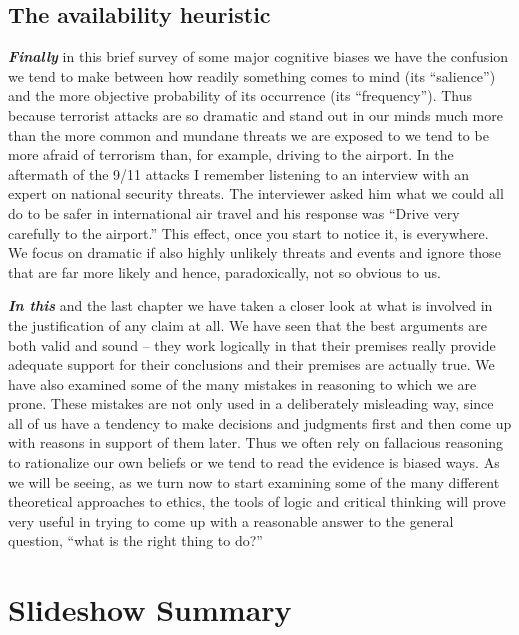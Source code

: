 \documentclass[
  12pt, openany]{book}
\theoremstyle{definition}
\theoremstyle{definition}
\theoremstyle{definition}
\theoremstyle{remark}
\begin{document}
\hypertarget{the-availability-heuristic}{%
\subsection*{The availability heuristic}\label{the-availability-heuristic}}


\textbf{\emph{Finally}} in this brief survey of some major cognitive biases we have the confusion we tend to make between how readily something comes to mind (its ``salience'') and the more objective probability of its occurrence (its ``frequency''). Thus because terrorist attacks are so dramatic and stand out in our minds much more than the more common and mundane threats we are exposed to we tend to be more afraid of terrorism than, for example, driving to the airport. In the aftermath of the 9/11 attacks I remember listening to an interview with an expert on national security threats. The interviewer asked him what we could all do to be safer in international air travel and his response was ``Drive very carefully to the airport.'' This effect, once you start to notice it, is everywhere. We focus on dramatic if also highly unlikely threats and events and ignore those that are far more likely and hence, paradoxically, not so obvious to us.

\textbf{\emph{In this}} and the last chapter we have taken a closer look at what is involved in the justification of any claim at all. We have seen that the best arguments are both valid and sound -- they work logically in that their premises really provide adequate support for their conclusions and their premises are actually true. We have also examined some of the many mistakes in reasoning to which we are prone. These mistakes are not only used in a deliberately misleading way, since all of us have a tendency to make decisions and judgments first and then come up with reasons in support of them later. Thus we often rely on fallacious reasoning to rationalize our own beliefs or we tend to read the evidence is biased ways. As we will be seeing, as we turn now to start examining some of the many different theoretical approaches to ethics, the tools of logic and critical thinking will prove very useful in trying to come up with a reasonable answer to the general question, ``what is the right thing to do?''

\hypertarget{slideshow-summary-2}{%
\section{Slideshow Summary}\label{slideshow-summary-2}}
\end{document}
